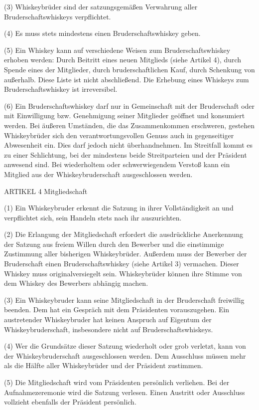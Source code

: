 (3) Whiskeybrüder sind der satzungsgemäßen Verwahrung aller Bruderschaftswhiskeys verpflichtet.

(4) Es muss stets mindestens einen Bruderschaftswhiskey geben.

(5) Ein Whiskey kann auf verschiedene Weisen zum Bruderschaftswhiskey erhoben werden: Durch Beitritt eines neuen Mitglieds (siehe Artikel 4), durch Spende eines der Mitglieder, durch bruderschaftlichen Kauf, durch Schenkung von außerhalb. Diese Liste ist nicht abschließend. Die Erhebung eines Whiskeys zum Bruderschaftswhiskey ist irreversibel.

(6) Ein Bruderschaftswhiskey darf nur in Gemeinschaft mit der Bruderschaft oder mit Einwilligung bzw. Genehmigung seiner Mitglieder geöffnet und konsumiert werden. Bei äußeren Umständen, die das Zusammenkommen erschweren, gestehen Whiskeybrüder sich den verantwortungsvollen Genuss auch in gegenseitiger Abwesenheit ein. Dies darf jedoch nicht überhandnehmen. Im Streitfall kommt es zu einer Schlichtung, bei der mindestens beide Streitparteien und der Präsident anwesend sind. Bei wiederholtem oder schwerwiegendem Verstoß kann ein Mitglied aus der Whiskeybruderschaft ausgeschlossen werden.



    ARTIKEL 4
    Mitgliedschaft

(1) Ein Whiskeybruder erkennt die  Satzung in ihrer Vollständigkeit an und verpflichtet sich, sein Handeln stets nach ihr auszurichten.

(2) Die Erlangung der Mitgliedschaft erfordert die ausdrückliche Anerkennung der Satzung aus freiem Willen durch den Bewerber und die einstimmige Zustimmung aller bisherigen Whiskeybrüder. Außerdem muss der Bewerber der Bruderschaft einen Bruderschaftswhiskey (siehe Artikel 3) vermachen. Dieser Whiskey muss originalversiegelt sein. Whiskeybrüder können ihre Stimme von dem Whiskey des Bewerbers abhängig machen.

(3) Ein Whiskeybruder kann seine Mitgliedschaft in der Bruderschaft freiwillig beenden. Dem hat ein Gespräch mit dem Präsidenten vorauszugehen. Ein austretender Whiskeybruder hat keinen Anspruch auf Eigentum der Whiskeybruderschaft, insbesondere nicht auf Bruderschaftswhiskeys.

(4) Wer die Grundsätze dieser Satzung wiederholt oder grob verletzt, kann von der Whiskeybruderschaft ausgeschlossen werden. Dem Ausschluss müssen mehr als die Hälfte aller Whiskeybrüder und der Präsident zustimmen.

(5) Die Mitgliedschaft wird vom Präsidenten persönlich verliehen. Bei der Aufnahmezeremonie wird die Satzung verlesen. Einen Austritt oder Ausschluss vollzieht ebenfalls der Präsident persönlich.

